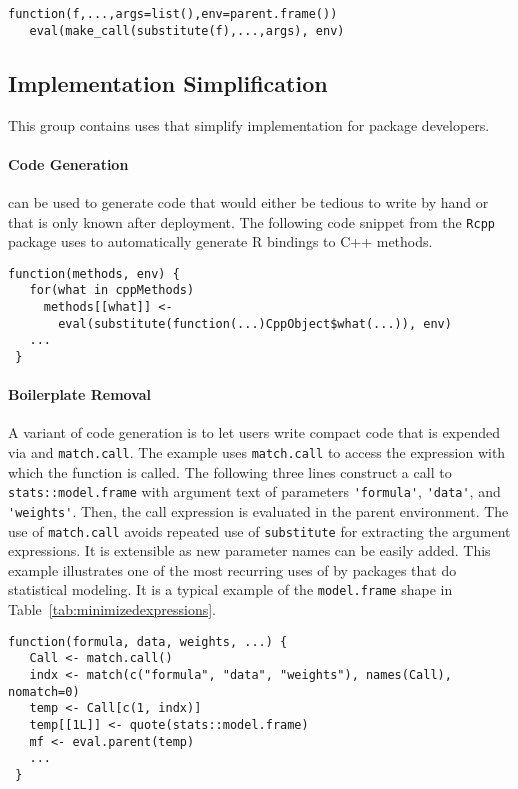 \documentclass[acmsmall, screen]{acmart}
\renewcommand{\k}[1]{\lstinline |#1|\xspace}
\begin{document}
\begin{lstlisting}[title={\k{igraph::do\_call}}, captionpos=b]
 function(f,...,args=list(),env=parent.frame())
   eval(make_call(substitute(f),...,args), env)
\end{lstlisting}

\subsection{Implementation Simplification}

This group contains \eval uses that simplify implementation for package
developers.

\paragraph{Code Generation} \Eval can be used to generate code that would either
be tedious to write by hand or that is only known after deployment. The
following code snippet from the \k{Rcpp} package uses \eval to automatically
generate R bindings to C++ methods.

\begin{lstlisting}[title={\k{Rcpp::.makeCppMethods}}, captionpos=b]
 function(methods, env) {
   for(what in cppMethods)
     methods[[what]] <-
       eval(substitute(function(...)CppObject$what(...)), env)
   ...
 }
\end{lstlisting}

\paragraph{Boilerplate Removal} A variant of code generation is to let users
write compact code that is expended via \eval and \k{match.call}. The example
uses \k{match.call} to access the expression with which the function is called.
The following three lines construct a call to \k{stats::model.frame} with
argument text of parameters \k{'formula'}, \k{'data'}, and \k{'weights'}. Then,
the call expression is evaluated in the parent environment. The use of
\k{match.call} avoids repeated use of \k{substitute} for extracting the argument
expressions. It is extensible as new parameter names can be easily added. This
example illustrates one of the most recurring uses of \eval by packages that do
statistical modeling. It is a typical example of the \k{model.frame} shape in
Table~\ref{tab:minimizedexpressions}.

\begin{lstlisting}[title={\k{survival::survfit.formula}}, captionpos=b]
 function(formula, data, weights, ...) {
   Call <- match.call()
   indx <- match(c("formula", "data", "weights"), names(Call), nomatch=0)
   temp <- Call[c(1, indx)]
   temp[[1L]] <- quote(stats::model.frame)
   mf <- eval.parent(temp)
   ...
 }
\end{lstlisting}
\medskip
\end{document}
